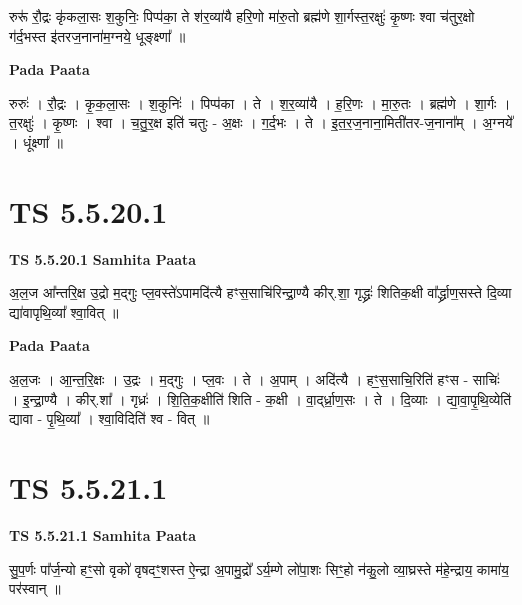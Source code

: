 \documentclass[17pt]{extarticle}
\begin{document}
रुरू॑ रौ॒द्रः कृ॑कला॒सः श॒कुनिः॒ पिप्प॑का॒ ते श॑र॒व्या॑यै हरि॒णो मा॑रु॒तो ब्रह्म॑णे शा॒र्गस्त॒रक्षुः॑ कृ॒ष्णः श्वा च॑तुर॒क्षो ग॑र्द॒भस्त इ॑तरज॒नाना॑म॒ग्नये॒ धूङ्क्ष्णा᳚ ॥ \newline

\textbf{Pada Paata} \newline

रुरुः॑ । रौ॒द्रः । कृ॒क॒ला॒सः । श॒कुनिः॑ । पिप्प॑का । ते । श॒र॒व्या॑यै । ह॒रि॒णः । मा॒रु॒तः । ब्रह्म॑णे । शा॒र्गः । त॒रक्षुः॑ । कृ॒ष्णः । श्वा । च॒तु॒र॒क्ष इति॑ चतुः - अ॒क्षः । ग॒र्द॒भः । ते । इ॒त॒र॒ज॒नाना॒मिती॑तर-ज॒नाना᳚म् । अ॒ग्नये᳚ । धूंक्ष्णा᳚ ॥  \newline





\section{ TS 5.5.20.1 }

\textbf{TS 5.5.20.1 } \newline
\textbf{Samhita Paata} \newline

अ॒ल॒ज आ᳚न्तरि॒क्ष उ॒द्रो म॒द्गुः प्ल॒वस्ते॑ऽपामदि॑त्यै हꣳस॒साचि॑रिन्द्रा॒ण्यै कीर्.शा॒ गृद्ध्रः॑ शितिक॒क्षी वा᳚र्द्ध्राण॒सस्ते दि॒व्या द्या॑वापृथि॒व्या᳚ श्वा॒वित् ॥ \newline

\textbf{Pada Paata} \newline

अ॒ल॒जः । आ॒न्त॒रि॒क्षः । उ॒द्रः । म॒द्गुः । प्ल॒वः । ते । अ॒पाम् । अदि॑त्यै । हꣳ॒॒स॒साचि॒रिति॑ हꣳस - साचिः॑ । इ॒न्द्रा॒ण्यै । कीर्.शा᳚ । गृध्रः॑ । शि॒ति॒क॒क्षीति॑ शिति - क॒क्षी । वा॒द्‌र्ध्रा॒ण॒सः । ते । दि॒व्याः । द्या॒वा॒पृ॒थि॒व्येति॑ द्यावा - पृ॒थि॒व्या᳚ । श्वा॒विदिति॑ श्व - वित् ॥  \newline





\section{ TS 5.5.21.1 }

\textbf{TS 5.5.21.1 } \newline
\textbf{Samhita Paata} \newline

सु॒प॒र्णः पा᳚र्ज॒न्यो हꣳ॒॒सो वृको॑ वृषदꣳ॒॒शस्त ऐ॒न्द्रा अ॒पामु॒द्रो᳚ ऽर्य॒म्णे लो॑पा॒शः सिꣳ॒॒हो न॑कु॒लो व्या॒घ्रस्ते म॑हे॒न्द्राय॒ कामा॑य॒ पर॑स्वान् ॥ \newline
\end{document}
